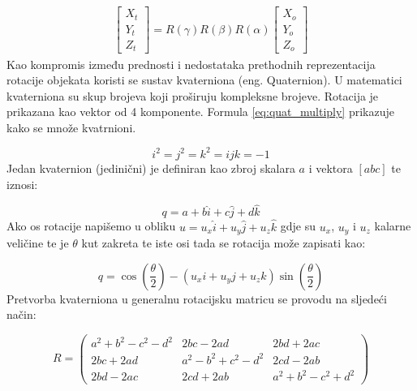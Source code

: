 \begin{gather}
    \begin{bmatrix} X_{t}\\ Y_{t}\\ Z_{t} \end{bmatrix}
    =
    R(\gamma)R(\beta)R(\alpha)
    \begin{bmatrix} X_{o}\\ Y_{o}\\ Z_{o} \end{bmatrix}
    \label{eq:rotate_point}
\end{gather}
Kao kompromis između prednosti i nedostataka prethodnih reprezentacija rotacije objekata koristi se sustav kvaterniona (eng. Quaternion). U matematici kvaterniona su skup brojeva koji proširuju kompleksne brojeve. Rotacija je prikazana kao vektor od 4 komponente. Formula \ref{eq:quat_multiply} prikazuje kako se množe kvatrnioni.

\begin{equation}
  i^2 = j^2 = k^2 = ijk = -1
  \label{eq:quat_multiply}
\end{equation}
Jedan kvaternion (jedinični) je definiran kao zbroj skalara $a$ i vektora $[a b c]$ te iznosi:

\begin{equation}
  q = a + b\hat{i} + c\hat{j} + d\hat{k}
  \label{eq:jedinicni_vektor}
\end{equation}
Ako os rotacije napišemo u obliku $u=u_{x}\hat{i} + u_{y}\hat{j} + u_{z}\hat{k}$ gdje su $u_{x}$, $u_{y}$ i $u_{z}$ kalarne veličine te je $\theta$ kut zakreta te iste osi tada se rotacija može zapisati kao:

\begin{equation}
  q=\cos(\frac{\theta}{2})-(u_{x}i + u_{y}j + u_{z}k)\sin(\frac{\theta}{2})
\end{equation}
Pretvorba kvaterniona u generalnu rotacijsku matricu se provodu na sljedeći način:

\begin{equation}
R = 
  \begin{pmatrix}
    a^2 + b^2 - c^2 - d^2 & 2bc - 2ad & 2bd + 2ac \\
    2bc + 2ad & a^2 - b^2 + c^2 - d^2 & 2cd - 2ab \\
    2bd - 2ac & 2cd + 2ab & a^2 + b^2 - c^2 + d^2
  \end{pmatrix}
  \label{eq:qvat_to_rot_mat}
\end{equation}
